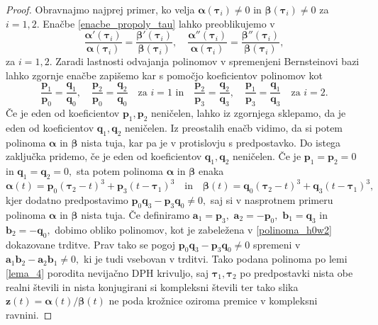 \documentclass[12pt,a4paper,twoside]{article}
\theoremstyle{definition} %
\theoremstyle{plain} %
\theoremstyle{primerstyle}
\numberwithin{equation}{section}  %
\newcommand{\aV}{\mathbf{a}}
\newcommand{\bV}{\mathbf{b}}
\newcommand{\pV}{\mathbf{p}}
\newcommand{\qV}{\mathbf{q}}
\newcommand{\zV}{\mathbf{z}}
\newcommand{\balpha}{\boldsymbol \alpha}
\newcommand{\bbeta}{\boldsymbol \beta}
\newcommand{\btau}{\boldsymbol \tau}
\begin{document}
\begin{proof}
	Obravnajmo najprej primer, ko velja $\balpha(\btau_i)\neq0$ in $\bbeta(\btau_i)\neq0$ za $i=1,2.$ Enačbe \eqref{enacbe_propoly_tau} lahko preoblikujemo v
	\begin{equation*}
		\frac{\balpha'(\btau_i)}{\balpha(\btau_i)}=\frac{\bbeta'(\btau_i)}{\bbeta(\btau_i)},\quad\frac{\balpha''(\btau_i)}{\balpha(\btau_i)}=\frac{\bbeta''(\btau_i)}{\bbeta(\btau_i)},
	\end{equation*}
	za $i=1,2.$ Zaradi lastnosti odvajanja polinomov v spremenjeni Bernsteinovi bazi lahko zgornje enačbe zapišemo kar s pomočjo koeficientov polinomov kot
	\begin{equation*}
		\frac{\pV_1}{\pV_0}=\frac{\qV_1}{\qV_0},\quad\frac{\pV_2}{\pV_0}=\frac{\qV_2}{\qV_0}\quad\text{za }i=1\text{  in}\quad\frac{\pV_2}{\pV_3}=\frac{\qV_2}{\qV_3},\quad\frac{\pV_1}{\pV_3}=\frac{\qV_1}{\qV_3}\quad\text{za }i=2.
	\end{equation*}
	Če je eden od koeficientov $\pV_1,\pV_2$ neničelen, lahko iz zgornjega sklepamo, da je eden od koeficientov $\qV_1,\qV_2$ neničelen. Iz preostalih enačb vidimo, da si potem polinoma $\balpha$ in $\bbeta$ nista tuja, kar pa je v protislovju s predpostavko. Do istega zaključka pridemo, če je eden od koeficientov $\qV_1,\qV_2$ neničelen. Če je $\pV_1=\pV_2=0$ in $\qV_1=\qV_2=0,$ sta potem polinoma $\balpha$ in $\bbeta$ enaka
	\begin{equation*}
		\balpha(t)=\pV_0(\btau_2-t)^3+\pV_3(t-\btau_1)^3\quad\text{in}\quad\bbeta(t)=\qV_0(\btau_2-t)^3+\qV_3(t-\btau_1)^3,
	\end{equation*}
	kjer dodatno predpostavimo $\pV_0\qV_3-\pV_3\qV_0\neq0,$ saj si v nasprotnem primeru polinoma $\balpha$ in $\bbeta$ nista tuja. Če definiramo $\aV_1=\pV_3,$ $\aV_2=-\pV_0,$ $\bV_1=\qV_3$ in $\bV_2=-\qV_0,$ dobimo obliko polinomov, kot je zabeležena v \eqref{polinoma_h0w2} dokazovane trditve. Prav tako se pogoj $\pV_0\qV_3-\pV_3\qV_0\neq0$ spremeni v $\aV_1\bV_2-\aV_2\bV_1\neq0,$ ki je tudi vsebovan v trditvi. Tako podana polinoma po lemi \ref{lema_4} porodita nevijačno DPH krivuljo, saj $\btau_1,\btau_2$ po predpostavki nista obe realni števili in nista konjugirani si kompleksni števili ter tako slika $\zV(t)=\balpha(t)/\bbeta(t)$ ne poda krožnice oziroma premice v kompleksni ravnini.
	

\end{proof}
\end{document}
